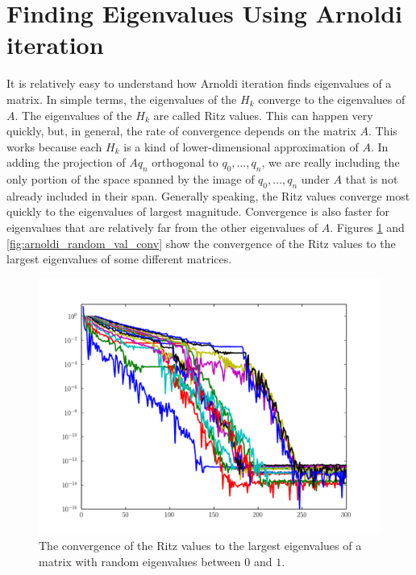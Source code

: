 
\section*{Finding Eigenvalues Using Arnoldi iteration}

It is relatively easy to understand how Arnoldi iteration finds eigenvalues of a matrix.
In simple terms, the eigenvalues of the $H_k$ converge to the eigenvalues of $A$.
The eigenvalues of the $H_k$ are called Ritz values.
This can happen very quickly, but, in general, the rate of convergence depends on the matrix $A$.
This works because each $H_k$ is a kind of lower-dimensional approximation of $A$.
In adding the projection of $A q_n$ orthogonal to $q_0, \ldots, q_n$, we are really including the only portion
of the space spanned by the image of $q_0, \dots, q_n$ under $A$ that is not already included in their span.
Generally speaking, the Ritz values converge most quickly to the eigenvalues of largest magnitude.
Convergence is also faster for eigenvalues that are relatively far from the other eigenvalues of $A$.
Figures \ref{fig:arnoldi_random_eig_conv} and \ref{fig:arnoldi_random_val_conv} show the convergence of the
Ritz values to the largest eigenvalues of some different matrices.

\begin{figure}
\includegraphics[width=\textwidth]{rand_eigs_conv.pdf}
\caption{The convergence of the Ritz values to the largest eigenvalues of a matrix with random eigenvalues between $0$ and $1$.}
\label{fig:arnoldi_random_eig_conv}
\end{figure}

